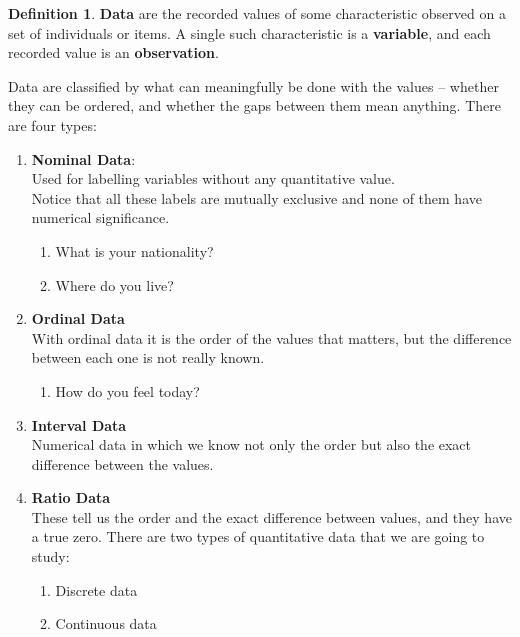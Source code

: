 \documentclass[11pt,a4paper]{article}
\theoremstyle{definition}
\newtheorem{definition}[thm]{Definition}
\begin{document}
\begin{definition}
\textbf{Data} are the recorded values of some characteristic observed on a set of
individuals or items. A single such characteristic is a \textbf{variable}, and each recorded
value is an \textbf{observation}.
\end{definition}

Data are classified by what can meaningfully be done with the values -- whether they can be
ordered, and whether the gaps between them mean anything. There are four types:
\begin{enumerate}
\item \textbf{Nominal Data}:\\
Used for labelling variables without any quantitative value.\\ Notice that all these labels are mutually exclusive and none of them have numerical significance.
\begin{enumerate}
       \item[$\longrightarrow$] What is your nationality?
       \item[$\longrightarrow$] Where do you live?
\end{enumerate}
\item \textbf{Ordinal Data}\\
With ordinal data it is the order of the values that matters, but the difference between each one is not really known.
\begin{enumerate}
   \item[$\longrightarrow$] How do you feel today?
\end{enumerate}
\item \textbf{Interval Data}\\
Numerical data in which we know not only the order but also the exact difference between the values.
\item \textbf{Ratio Data}\\
These tell us the order and the exact difference between values, and they have a true zero.  There are two types of quantitative data that we are going to study:
\begin{enumerate}
     \item Discrete data
     \item Continuous data\\
\end{enumerate}
\end{enumerate}
\end{document}
